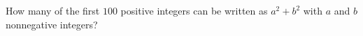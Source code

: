 How many of the first $100$ positive integers can be written as $a^2+b^2$ with $a$ and $b$ nonnegative integers?
